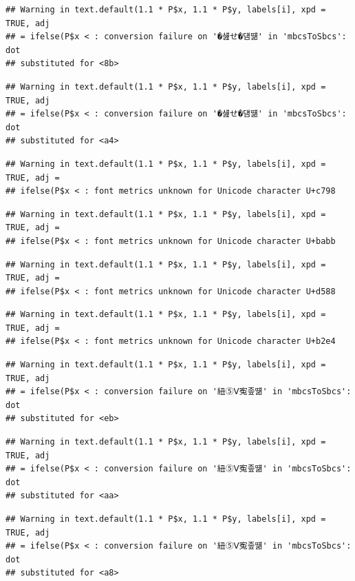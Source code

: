 \documentclass[
]{article}
\begin{document}
\begin{verbatim}
## Warning in text.default(1.1 * P$x, 1.1 * P$y, labels[i], xpd = TRUE, adj
## = ifelse(P$x < : conversion failure on '�섎せ�덈떎' in 'mbcsToSbcs': dot
## substituted for <8b>
\end{verbatim}

\begin{verbatim}
## Warning in text.default(1.1 * P$x, 1.1 * P$y, labels[i], xpd = TRUE, adj
## = ifelse(P$x < : conversion failure on '�섎せ�덈떎' in 'mbcsToSbcs': dot
## substituted for <a4>
\end{verbatim}

\begin{verbatim}
## Warning in text.default(1.1 * P$x, 1.1 * P$y, labels[i], xpd = TRUE, adj =
## ifelse(P$x < : font metrics unknown for Unicode character U+c798
\end{verbatim}

\begin{verbatim}
## Warning in text.default(1.1 * P$x, 1.1 * P$y, labels[i], xpd = TRUE, adj =
## ifelse(P$x < : font metrics unknown for Unicode character U+babb
\end{verbatim}

\begin{verbatim}
## Warning in text.default(1.1 * P$x, 1.1 * P$y, labels[i], xpd = TRUE, adj =
## ifelse(P$x < : font metrics unknown for Unicode character U+d588
\end{verbatim}

\begin{verbatim}
## Warning in text.default(1.1 * P$x, 1.1 * P$y, labels[i], xpd = TRUE, adj =
## ifelse(P$x < : font metrics unknown for Unicode character U+b2e4
\end{verbatim}

\begin{verbatim}
## Warning in text.default(1.1 * P$x, 1.1 * P$y, labels[i], xpd = TRUE, adj
## = ifelse(P$x < : conversion failure on '紐⑤Ⅴ寃좊떎' in 'mbcsToSbcs': dot
## substituted for <eb>
\end{verbatim}

\begin{verbatim}
## Warning in text.default(1.1 * P$x, 1.1 * P$y, labels[i], xpd = TRUE, adj
## = ifelse(P$x < : conversion failure on '紐⑤Ⅴ寃좊떎' in 'mbcsToSbcs': dot
## substituted for <aa>
\end{verbatim}

\begin{verbatim}
## Warning in text.default(1.1 * P$x, 1.1 * P$y, labels[i], xpd = TRUE, adj
## = ifelse(P$x < : conversion failure on '紐⑤Ⅴ寃좊떎' in 'mbcsToSbcs': dot
## substituted for <a8>
\end{verbatim}
\end{document}
